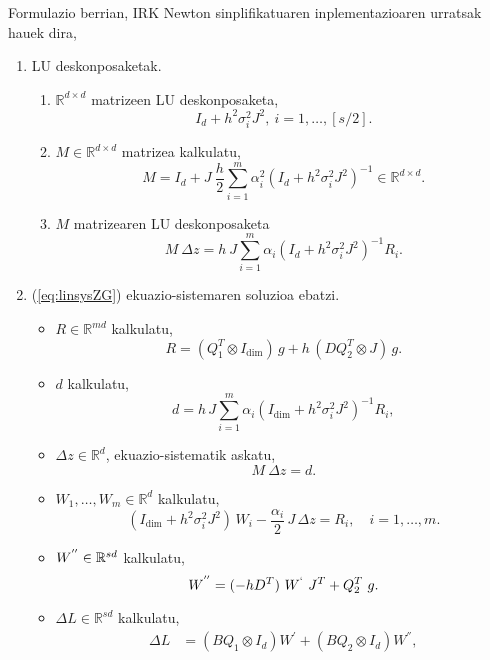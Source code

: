 Formulazio berrian, IRK Newton sinplifikatuaren inplementazioaren urratsak hauek dira,
\begin{enumerate}

\item LU deskonposaketak.
    \begin{enumerate}
     \item $\mathbb{R}^{d \times d}$ matrizeen LU deskonposaketa,
         \begin{equation*}
         I_d+h^2 \sigma_i^2 J^2, \ i=1,\dots,[s/2].
         \end{equation*}
     \item $M \in \mathbb{R}^{d \times d}$ matrizea kalkulatu,
         \begin{equation*}
          M=I_d+J \ \frac{h}{2}\sum\limits_{i=1}^{m} \alpha_i^2 (I_d+h^2 \sigma_i^2 J^2)^{-1} \in \mathbb{R}^{d \times d}.
         \end{equation*}
      \item $M$ matrizearen LU deskonposaketa
         \begin{equation*}
          M \ \Delta z=h \ J\sum\limits_{i=1}^{m}\alpha_i (I_d+h^2\sigma_i^2J^2)^{-1}R_i.
         \end{equation*}
    \end{enumerate}


\item (\ref{eq:linsysZG}) ekuazio-sistemaren soluzioa ebatzi.
    \begin{itemize}
    \item $R \in \mathbb{R}^{md}$ kalkulatu,
    \begin{equation*}
     R=(Q_1^T  \otimes I_\dim) \, g + h \,  ( D Q_2^T \otimes J)\, g.
    \end{equation*}
    \item $d$ kalkulatu,
    \begin{equation*}
    d= h\, J \sum_{i=1}^{m} \alpha_i  (I_\dim +  h^2 \sigma_i^2 J^2)^{-1} R_i,
    \end{equation*}
    \item $\Delta z \in \mathbb{R}^d$, ekuazio-sistematik askatu,
    \begin{equation*}
    M \ \Delta z=d.
    \end{equation*} 
    \item $W_1, \dots, W_m \in \mathbb{R}^d$ kalkulatu,
    \begin{equation*}
    (I_\dim +  h^2 \sigma_i^2 J^2) \, W_i - \frac{\alpha_i}{2}\, J \, \Delta z = R_i, \quad i=1,\ldots,m.
    \end{equation*}
    \item $W^{''} \in \mathbb{R}^{sd}$ kalkulatu,
    \begin{equation*}
     W^{''} = (-hD^T) \ W^{`} \ J^T+Q_2^T \ g.
    \end{equation*}
     \item $\Delta L \in \mathbb{R}^{sd}$ kalkulatu,
     \begin{align*}
     \Delta L &=(B Q_1 \otimes I_d) W^{'}+(B Q_2 \otimes I_d) W^{''}, \\
     \end{align*}
    \end{itemize}


\end{enumerate}
